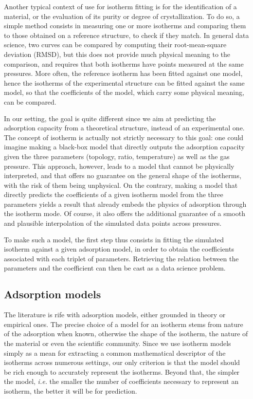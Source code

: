 \documentclass[main.tex]{subfiles}
\begin{document}
Another typical context of use for isotherm fitting is for the identification of a material, or the evaluation of its purity or degree of crystallization. To do so, a simple method consists in measuring one or more isotherms and comparing them to those obtained on a reference structure, to check if they match. In general data science, two curves can be compared by computing their root-mean-square deviation (RMSD), but this does not provide much physical meaning to the comparison, and requires that both isotherms have points measured at the same pressures. More often, the reference isotherm has been fitted against one model, hence the isotherms of the experimental structure can be fitted against the same model, so that the coefficients of the model, which carry some physical meaning, can be compared.

In our setting, the goal is quite different since we aim at predicting the adsorption capacity from a theoretical structure, instead of an experimental one. The concept of isotherm is actually not strictly necessary to this goal: one could imagine making a black-box model that directly outputs the adsorption capacity given the three parameters (topology, \SiAl ratio, temperature) as well as the gas pressure. This approach, however, leads to a model that cannot be physically interpreted, and that offers no guarantee on the general shape of the isotherms, with the risk of them being unphysical. On the contrary, making a model that directly predicts the coefficients of a given isotherm model from the three parameters yields a result that already embeds the physics of adsorption through the isotherm mode. Of course, it also offers the additional guarantee of a smooth and plausible interpolation of the simulated data points across pressures.

To make such a model, the first step thus consists in fitting the simulated isotherm against a given adsorption model, in order to obtain the coefficients associated with each triplet of parameters. Retrieving the relation between the parameters and the coefficient can then be cast as a data science problem.

\subsection{Adsorption models}

The literature is rife with adsorption models, either grounded in theory or empirical ones. The precise choice of a model for an isotherm stems from nature of the adsorption when known, otherwise the shape of the isotherm, the nature of the material or even the scientific community. Since we use isotherm models simply as a mean for extracting a common mathematical descriptor of the isotherms across numerous settings, our only criterion is that the model should be rich enough to accurately represent the isotherms. Beyond that, the simpler the model, \textit{i.e.} the smaller the number of coefficients necessary to represent an isotherm, the better it will be for prediction.
\end{document}

